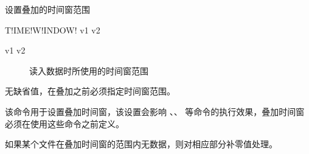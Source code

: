 \label{sss:timewindow}

设置叠加的时间窗范围

\begin{SACSTX}
T!IME!W!INDOW! v1 v2
\end{SACSTX}

\begin{description}
\item [v1 v2] 读入数据时所使用的时间窗范围
\end{description}

无缺省值，在叠加之前必须指定时间窗范围。

该命令用于设置叠加时间窗，该设置会影响 、、 等命令的执行效果，叠加时间窗必须在使用这些命令之前定义。

如果某个文件在叠加时间窗的范围内无数据，则对相应部分补零值处理。
